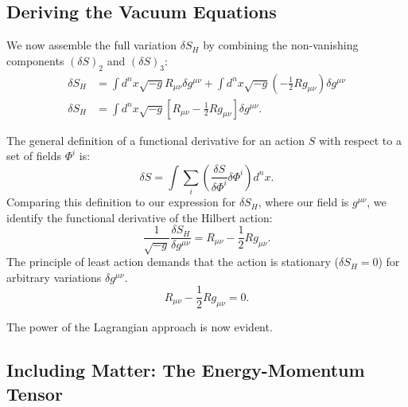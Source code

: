 \documentclass[11pt, a4paper]{report}
\begin{document}
\subsection{Deriving the Vacuum Equations}

We now assemble the full variation $\delta S_{H}$ by combining the non-vanishing components $(\delta S)_{2}$ and $(\delta S)_{3}$:
\begin{align}
\delta S_{H} &= \int d^{n}x \sqrt{-g} R_{\mu\nu} \delta g^{\mu\nu} + \int d^{n}x \sqrt{-g} \left( -\frac{1}{2} R g_{\mu\nu} \right) \delta g^{\mu\nu} \nonumber \\
\delta S_{H} &= \int d^{n}x \sqrt{-g} \left[ R_{\mu\nu} - \frac{1}{2}R g_{\mu\nu} \right] \delta g^{\mu\nu}. %
\end{align}

The general definition of a functional derivative for an action $S$ with respect to a set of fields $\Phi^{i}$ is: %
\begin{equation}
\delta S = \int \sum_{i} \left( \frac{\delta S}{\delta \Phi^{i}} \delta \Phi^{i} \right) d^{n}x. %
\end{equation}
Comparing this definition to our expression for $\delta S_{H}$, where our field is $g^{\mu\nu}$, we identify the functional derivative of the Hilbert action:
\begin{equation}
\frac{1}{\sqrt{-g}} \frac{\delta S_{H}}{\delta g^{\mu\nu}} = R_{\mu\nu} - \frac{1}{2}R g_{\mu\nu}. %
\end{equation}
The principle of least action demands that the action is stationary ($\delta S_{H} = 0$) for arbitrary variations $\delta g^{\mu\nu}$. %
\begin{equation}
R_{\mu\nu} - \frac{1}{2}R g_{\mu\nu} = 0. %
\end{equation}

The power of the Lagrangian approach is now evident. %

\subsection{Including Matter: The Energy-Momentum Tensor}
\end{document}
